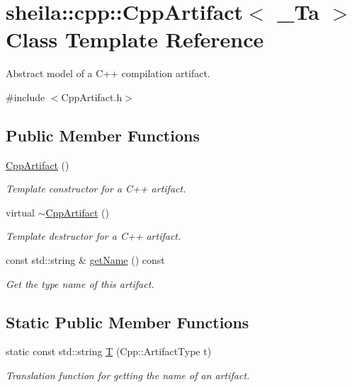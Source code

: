 \hypertarget{classsheila_1_1cpp_1_1CppArtifact}{}\section{sheila\+:\+:cpp\+:\+:Cpp\+Artifact$<$ \+\_\+\+Ta $>$ Class Template Reference}
\label{classsheila_1_1cpp_1_1CppArtifact}


Abstract model of a C++ compilation artifact.  




{\ttfamily \#include $<$Cpp\+Artifact.\+h$>$}

\subsection*{Public Member Functions}
\begin{DoxyCompactItemize}
\item 
\hyperlink{classsheila_1_1cpp_1_1CppArtifact_a6ae5024142a61de610d41837118ea03a}{Cpp\+Artifact} ()
\begin{DoxyCompactList}\small\item\em Template constructor for a C++ artifact. \end{DoxyCompactList}\item 
virtual \hyperlink{classsheila_1_1cpp_1_1CppArtifact_a7364167754970c84117040977852e02e}{$\sim$\+Cpp\+Artifact} ()
\begin{DoxyCompactList}\small\item\em Template destructor for a C++ artifact. \end{DoxyCompactList}\item 
const std\+::string \& \hyperlink{classsheila_1_1cpp_1_1CppArtifact_a332280dc9ba793d32174af0fd8eae6b7}{get\+Name} () const 
\begin{DoxyCompactList}\small\item\em Get the type name of this artifact. \end{DoxyCompactList}\end{DoxyCompactItemize}
\subsection*{Static Public Member Functions}
\begin{DoxyCompactItemize}
\item 
static const std\+::string \hyperlink{classsheila_1_1cpp_1_1CppArtifact_aa44bfa66264835921258c41e6de7acf0}{T} (Cpp\+::\+Artifact\+Type t)
\begin{DoxyCompactList}\small\item\em Translation function for getting the name of an artifact. \end{DoxyCompactList}\end{DoxyCompactItemize}


